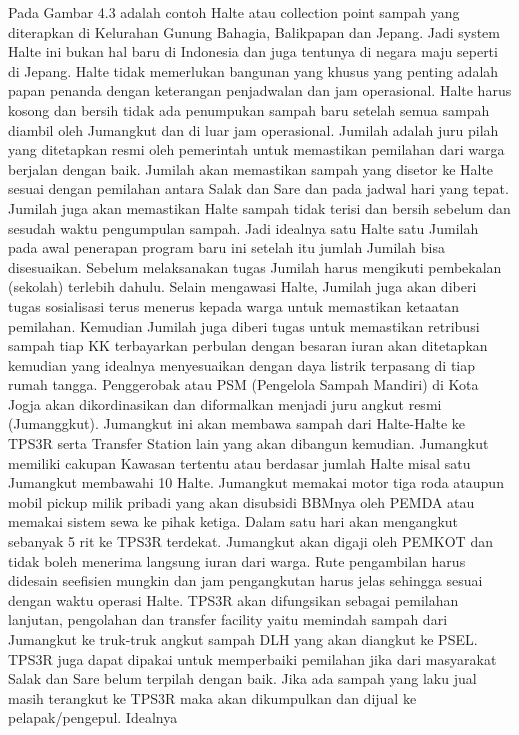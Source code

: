 \documentclass[
  letterpaper,
  DIV=11,
  numbers=noendperiod]{scrreprt}
\begin{document}
Pada Gambar 4.3 adalah contoh Halte atau collection point sampah yang
diterapkan di Kelurahan Gunung Bahagia, Balikpapan dan Jepang. Jadi
system Halte ini bukan hal baru di Indonesia dan juga tentunya di negara
maju seperti di Jepang. Halte tidak memerlukan bangunan yang khusus yang
penting adalah papan penanda dengan keterangan penjadwalan dan jam
operasional. Halte harus kosong dan bersih tidak ada penumpukan sampah
baru setelah semua sampah diambil oleh Jumangkut dan di luar jam
operasional. Jumilah adalah juru pilah yang ditetapkan resmi oleh
pemerintah untuk memastikan pemilahan dari warga berjalan dengan baik.
Jumilah akan memastikan sampah yang disetor ke Halte sesuai dengan
pemilahan antara Salak dan Sare dan pada jadwal hari yang tepat. Jumilah
juga akan memastikan Halte sampah tidak terisi dan bersih sebelum dan
sesudah waktu pengumpulan sampah. Jadi idealnya satu Halte satu Jumilah
pada awal penerapan program baru ini setelah itu jumlah Jumilah bisa
disesuaikan. Sebelum melaksanakan tugas Jumilah harus mengikuti
pembekalan (sekolah) terlebih dahulu. Selain mengawasi Halte, Jumilah
juga akan diberi tugas sosialisasi terus menerus kepada warga untuk
memastikan ketaatan pemilahan. Kemudian Jumilah juga diberi tugas untuk
memastikan retribusi sampah tiap KK terbayarkan perbulan dengan besaran
iuran akan ditetapkan kemudian yang idealnya menyesuaikan dengan daya
listrik terpasang di tiap rumah tangga. Penggerobak atau PSM (Pengelola
Sampah Mandiri) di Kota Jogja akan dikordinasikan dan diformalkan
menjadi juru angkut resmi (Jumanggkut). Jumangkut ini akan membawa
sampah dari Halte-Halte ke TPS3R serta Transfer Station lain yang akan
dibangun kemudian. Jumangkut memiliki cakupan Kawasan tertentu atau
berdasar jumlah Halte misal satu Jumangkut membawahi 10 Halte. Jumangkut
memakai motor tiga roda ataupun mobil pickup milik pribadi yang akan
disubsidi BBMnya oleh PEMDA atau memakai sistem sewa ke pihak ketiga.
Dalam satu hari akan mengangkut sebanyak 5 rit ke TPS3R terdekat.
Jumangkut akan digaji oleh PEMKOT dan tidak boleh menerima langsung
iuran dari warga. Rute pengambilan harus didesain seefisien mungkin dan
jam pengangkutan harus jelas sehingga sesuai dengan waktu operasi Halte.
TPS3R akan difungsikan sebagai pemilahan lanjutan, pengolahan dan
transfer facility yaitu memindah sampah dari Jumangkut ke truk-truk
angkut sampah DLH yang akan diangkut ke PSEL. TPS3R juga dapat dipakai
untuk memperbaiki pemilahan jika dari masyarakat Salak dan Sare belum
terpilah dengan baik. Jika ada sampah yang laku jual masih terangkut ke
TPS3R maka akan dikumpulkan dan dijual ke pelapak/pengepul. Idealnya
\end{document}

